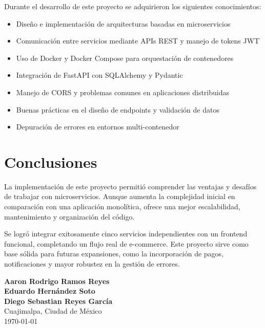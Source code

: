 \documentclass[11pt,a4paper]{article}
\begin{document}
Durante el desarrollo de este proyecto se adquirieron los siguientes conocimientos:

\begin{itemize}
    \item Diseño e implementación de arquitecturas basadas en microservicios
    \item Comunicación entre servicios mediante APIs REST y manejo de tokens JWT
    \item Uso de Docker y Docker Compose para orquestación de contenedores
    \item Integración de FastAPI con SQLAlchemy y Pydantic
    \item Manejo de CORS y problemas comunes en aplicaciones distribuidas
    \item Buenas prácticas en el diseño de endpoints y validación de datos
    \item Depuración de errores en entornos multi-contenedor
\end{itemize}

\section{Conclusiones}

La implementación de este proyecto permitió comprender las ventajas y desafíos de trabajar con microservicios. Aunque aumenta la complejidad inicial en comparación con una aplicación monolítica, ofrece una mejor escalabilidad, mantenimiento y organización del código.

Se logró integrar exitosamente cinco servicios independientes con un frontend funcional, completando un flujo real de e-commerce. Este proyecto sirve como base sólida para futuras expansiones, como la incorporación de pagos, notificaciones y mayor robustez en la gestión de errores.

\vspace{1cm}
\textbf{Aaron Rodrigo Ramos Reyes} \\
\textbf{Eduardo Hernández Soto} \\
\textbf{Diego Sebastian Reyes García} \\
Cuajimalpa, Ciudad de México \\
\today
\end{document}
